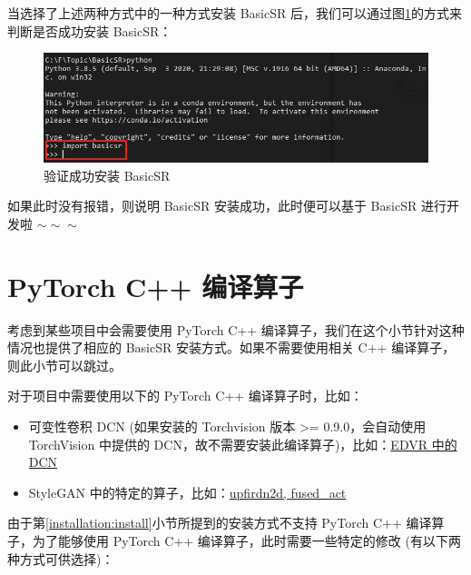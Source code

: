 \documentclass[../main.tex]{subfiles}
\begin{document}
当选择了上述两种方式中的一种方式安装 BasicSR 后，我们可以通过图\ref{fig:correct-install}的方式来判断是否成功安装 BasicSR：

\begin{figure}[H]
    \begin{center}
        \includegraphics[width=0.9\linewidth]{figures/installation_correct_install.jpg}
        \caption{验证成功安装 BasicSR}
        \label{fig:correct-install}
    \end{center}
    \vspace{-0.5cm}
\end{figure}

如果此时没有报错，则说明 BasicSR 安装成功，此时便可以基于 BasicSR 进行开发啦 $\sim \sim \sim$

\section{PyTorch C++ 编译算子}\label{installation:c++}

考虑到某些项目中会需要使用 PyTorch C++ 编译算子，我们在这个小节针对这种情况也提供了相应的 BasicSR 安装方式。如果不需要使用相关 C++ 编译算子，则此小节可以跳过。

对于项目中需要使用以下的 PyTorch C++ 编译算子时，比如：

\begin{itemize}
    \item 可变性卷积 DCN (如果安装的 Torchvision 版本 >= 0.9.0，会自动使用 TorchVision 中提供的 DCN，故不需要安装此编译算子)，比如：\href{https://github.com/XPixelGroup/BasicSR/tree/master/basicsr/ops}{EDVR 中的 DCN}

    \item StyleGAN 中的特定的算子，比如：\href{https://github.com/XPixelGroup/BasicSR/tree/master/basicsr/ops}{upfirdn2d, fused\_act}
\end{itemize}

由于第\ref{installation:install}小节所提到的安装方式不支持 PyTorch C++ 编译算子，为了能够使用 PyTorch C++ 编译算子，此时需要一些特定的修改 (有以下两种方式可供选择)：
\end{document}
